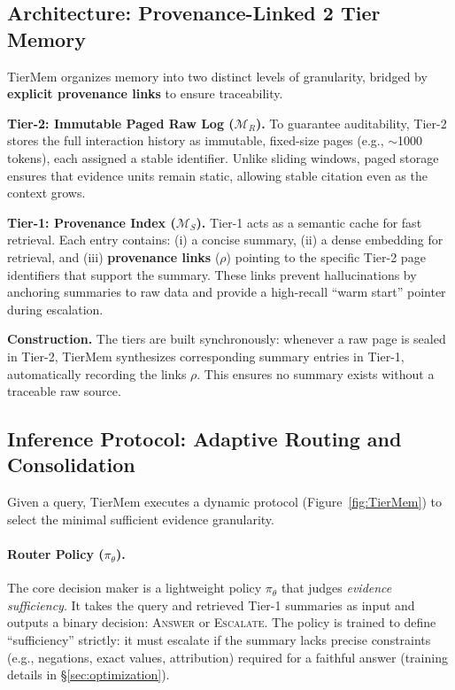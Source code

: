 \documentclass{article}
\theoremstyle{plain}
\theoremstyle{definition}
\theoremstyle{remark}
\newcommand{\Msum}{\mathcal{M}_S}        %
\newcommand{\Mraw}{\mathcal{M}_R}        %
\begin{document}
\subsection{Architecture: Provenance-Linked 2 Tier Memory}
\label{sec:arch}

TierMem organizes memory into two distinct levels of granularity, bridged by \textbf{explicit provenance links} to ensure traceability.

\vspace{0.25em}
\noindent\textbf{Tier-2: Immutable Paged Raw Log ($\Mraw$).}
To guarantee auditability, Tier-2 stores the full interaction history as immutable, fixed-size pages (e.g., $\sim$1000 tokens), each assigned a stable identifier.
Unlike sliding windows, paged storage ensures that evidence units remain static, allowing stable citation even as the context grows.

\vspace{0.25em}
\noindent\textbf{Tier-1: Provenance Index ($\Msum$).}
Tier-1 acts as a semantic cache for fast retrieval.
Each entry contains: (i) a concise summary, (ii) a dense embedding for retrieval, and (iii) \textbf{provenance links} ($\rho$) pointing to the specific Tier-2 page identifiers that support the summary.
These links prevent hallucinations by anchoring summaries to raw data and provide a high-recall ``warm start'' pointer during escalation.

\vspace{0.25em}
\noindent\textbf{Construction.}
The tiers are built synchronously: whenever a raw page is sealed in Tier-2, TierMem synthesizes corresponding summary entries in Tier-1, automatically recording the links $\rho$. This ensures no summary exists without a traceable raw source.

\subsection{Inference Protocol: Adaptive Routing and Consolidation}
\label{sec:protocol}

Given a query, TierMem executes a dynamic protocol (Figure~\ref{fig:TierMem}) to select the minimal sufficient evidence granularity.

\paragraph{Router Policy ($\pi_\theta$).}
The core decision maker is a lightweight policy $\pi_\theta$ that judges \emph{evidence sufficiency}.
It takes the query and retrieved Tier-1 summaries as input and outputs a binary decision: \textsc{Answer} or \textsc{Escalate}.
The policy is trained to define ``sufficiency'' strictly: it must escalate if the summary lacks precise constraints (e.g., negations, exact values, attribution) required for a faithful answer (training details in \S\ref{sec:optimization}).
\end{document}
